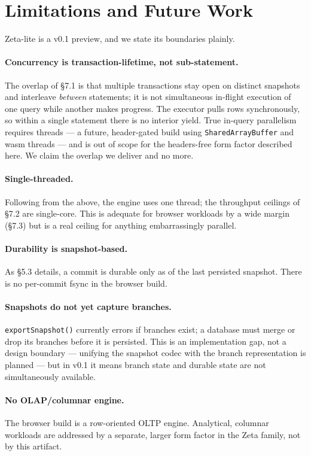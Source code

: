 \documentclass[11pt]{article}
\begin{document}
\section{Limitations and Future Work}

Zeta-lite is a v0.1 preview, and we state its boundaries plainly.

\paragraph{Concurrency is transaction-lifetime, not sub-statement.}
The overlap of \S7.1 is that multiple transactions stay open on distinct snapshots
and interleave \emph{between} statements; it is not simultaneous in-flight execution
of one query while another makes progress. The executor pulls rows synchronously, so
within a single statement there is no interior yield. True in-query parallelism
requires threads --- a future, header-gated build using \texttt{SharedArrayBuffer}
and wasm threads --- and is out of scope for the headers-free form factor described
here. We claim the overlap we deliver and no more.

\paragraph{Single-threaded.}
Following from the above, the engine uses one thread; the throughput ceilings of
\S7.2 are single-core. This is adequate for browser workloads by a wide margin
(\S7.3) but is a real ceiling for anything embarrassingly parallel.

\paragraph{Durability is snapshot-based.}
As \S5.3 details, a commit is durable only as of the last persisted snapshot. There
is no per-commit fsync in the browser build.

\paragraph{Snapshots do not yet capture branches.}
\texttt{exportSnapshot()} currently errors if branches exist; a database must merge
or drop its branches before it is persisted. This is an implementation gap, not a
design boundary --- unifying the snapshot codec with the branch representation is
planned --- but in v0.1 it means branch state and durable state are not
simultaneously available.

\paragraph{No OLAP/columnar engine.}
The browser build is a row-oriented OLTP engine. Analytical, columnar workloads are
addressed by a separate, larger form factor in the Zeta family, not by this
artifact.
\end{document}
